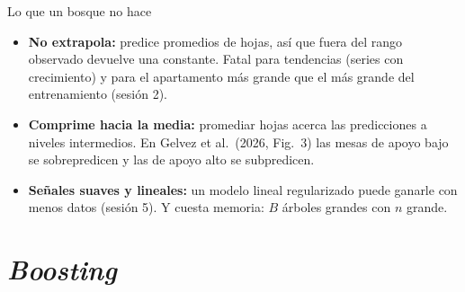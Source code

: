 \documentclass{beamer}
\newcommand{\1}{\mathbb{I}}
\begin{document}
\begin{frame}{Lo que un bosque no hace}
\small
\begin{center}
\end{center}
\pause
\begin{itemize}\itemsep3pt
  \item \textbf{No extrapola:} predice promedios de hojas, así que fuera del rango observado devuelve una constante. Fatal para tendencias (series con crecimiento) y para el apartamento más grande que el más grande del entrenamiento (sesión 2). \pause
  \item \textbf{Comprime hacia la media:} promediar hojas acerca las predicciones a niveles intermedios. En Gelvez et al.\ (2026, Fig.\ 3) las mesas de apoyo bajo se sobrepredicen y las de apoyo alto se subpredicen. \pause
  \item \textbf{Señales suaves y lineales:} un modelo lineal regularizado puede ganarle con menos datos (sesión 5). Y cuesta memoria: $B$ árboles grandes con $n$ grande.
\end{itemize}
\end{frame}


\section{\emph{Boosting}}
\begin{frame}[noframenumbering]
\tableofcontents[currentsection]
\end{frame}
\end{document}
